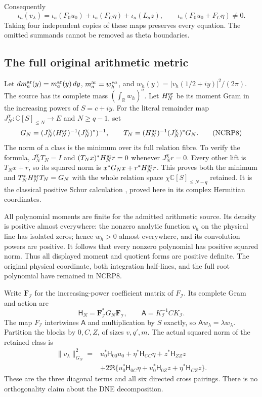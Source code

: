 Consequently
\[
 \iota_a(v_\lambda)
 =\iota_a(F_0u_0)+\iota_a(F_C\eta)+\iota_a(L_az),
 \qquad
 \iota_a(F_0u_0+F_C\eta)\ne0.
 \tag{NCRP7}
\]
Taking four independent copies of these maps preserves every
equation. The omitted summands cannot be removed as theta boundaries.

\subsection{The full original arithmetic metric}

Let $dm_a^{\rm ar}(y)=m_a^{\rm ar}(y)\,dy$,
$m_a^{\rm ar}=w_h^{*a}$, and
$w_h(y)=|v_h(1/2+iy)|^2/(2\pi)$.
The source has its complete mass $(\int_{\mathbb R}w_h)^a$.
Let $H_N^{\rm ar}$ be its moment Gram in the increasing powers of
$S=c+iy$. For the literal remainder map
$J_N^{\chi}:\mathbb C[S]_{\le N}\to E$ and $N\ge q-1$, set
\[
 G_N=(J_N^\chi(H_N^{\rm ar})^{-1}(J_N^\chi)^*)^{-1},
 \qquad
 T_N=(H_N^{\rm ar})^{-1}(J_N^\chi)^*G_N.
 \tag{NCRP8}
\]
The norm of a class is the minimum over its full relation fibre.
To verify the formula, $J_N^\chi T_N=I$ and
$(T_Nx)^*H_N^{\rm ar}r=0$ whenever $J_N^\chi r=0$.
Every other lift is $T_Nx+r$, so its squared norm is
$x^*G_Nx+r^*H_N^{\rm ar}r$. This proves both the minimum and
$T_N^*H_N^{\rm ar}T_N=G_N$ with the whole relation space
$\chi\mathbb C[S]_{\le N-q}$ retained. It is the classical positive
Schur calculation \cite{human:boyd-vandenberghe}, proved here in
its complex Hermitian coordinates.

All polynomial moments are finite for the admitted arithmetic source.
Its density is positive almost everywhere: the nonzero analytic
function $v_h$ on the physical line has isolated zeros; hence
$w_h>0$ almost everywhere, and its convolution powers are positive.
It follows that every nonzero polynomial has positive squared norm.
Thus all displayed moment and quotient forms are positive definite.
The original physical coordinate, both integration half-lines, and
the full root polynomial have remained in NCRP8.

Write $\mathbf F_{\mathcal I}$ for the increasing-power coefficient
matrix of $F_{\mathcal I}$. Its complete Gram and action are
\[
 \mathsf H_N=\mathbf F_{\mathcal I}^*G_N\mathbf F_{\mathcal I},
 \qquad
 \mathsf A=K_{\mathcal I}^{-1}CK_{\mathcal I}.
 \tag{NCRP9}
\]
The map $F_{\mathcal I}$ intertwines $\mathsf A$ and multiplication
by $S$ exactly, so
$\mathsf A w_\lambda=\lambda w_\lambda$.
Partition the blocks by $0,C,Z$, of sizes $v,q',m$. The actual
squared norm of the retained class is
\[
 \begin{split}
 \|v_\lambda\|_{G_N}^2={}&
 u_0^*\mathsf H_{00}u_0+\eta^*\mathsf H_{CC}\eta
       +z^*\mathsf H_{ZZ}z\\
 &+2\Re\{u_0^*\mathsf H_{0C}\eta
              +u_0^*\mathsf H_{0Z}z
              +\eta^*\mathsf H_{CZ}z\}.
 \end{split}                                                     \tag{NCRP10}
\]
These are the three diagonal terms and all six directed cross
pairings. There is no orthogonality claim about the DNE decomposition.

